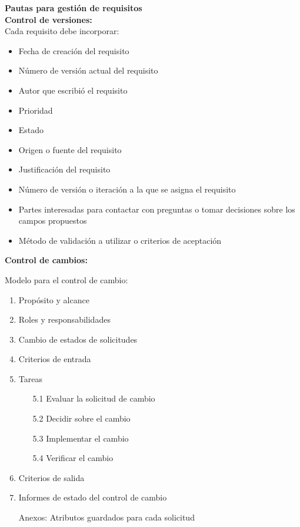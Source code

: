     \newpage
    
    \textbf{Pautas para gestión de requisitos}\\
    
    \textbf{Control de versiones:}\\
    
    Cada requisito debe incorporar:
    
    \begin{itemize}
        \item Fecha de creación del requisito
        \item Número de versión actual del requisito
        \item Autor que escribió el requisito
        \item Prioridad
        \item Estado
        \item Origen o fuente del requisito
        \item Justificación del requisito
        \item Número de versión o iteración a la que se asigna el requisito
        \item Partes interesadas para contactar con preguntas o tomar decisiones sobre los campos propuestos
        \item Método de validación a utilizar o criterios de aceptación
    \end{itemize}
    
    \textbf{Control de cambios:}
    
    Modelo para el control de cambio:
    
    \begin{enumerate}
        \item Propósito y alcance
        \item Roles y responsabilidades
        \item Cambio de estados de solicitudes
        \item Criterios de entrada
        \item Tareas
            \begin{enumerate}
                \item[5.1] Evaluar la solicitud de cambio
                \item[5.2] Decidir sobre el cambio
                \item[5.3] Implementar el cambio
                \item[5.4] Verificar el cambio
            \end{enumerate}
        \item Criterios de salida
        \item Informes de estado del control de cambio
        \item[] Anexos: Atributos guardados para cada solicitud
        
    \end{enumerate}
    

